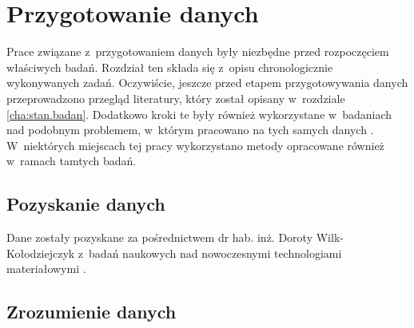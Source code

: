\chapter{Przygotowanie danych}
\label{cha:przyg.danych}

Prace związane z~przygotowaniem danych były niezbędne przed rozpoczęciem właściwych badań. Rozdział ten składa się z~opisu chronologicznie wykonywanych zadań. Oczywiście, jeszcze przed etapem przygotowywania danych przeprowadzono przegląd literatury, który został opisany w~rozdziale \ref{cha:stan.badan}. Dodatkowo kroki te były również wykorzystane w~badaniach nad podobnym problemem, w~którym pracowano na tych samych danych \cite{Reczek21}. W~niektórych miejscach tej pracy wykorzystano metody opracowane również w~ramach tamtych badań.

\section{Pozyskanie danych}
\label{sec:pozyskanie_danych}

Dane zostały pozyskane za pośrednictwem dr hab. inż. Doroty Wilk-Kołodziejczyk z~badań naukowych nad nowoczesnymi technologiami materiałowymi \cite{Pirowski17, specodlew}.

\section{Zrozumienie danych}
\label{sec:zrozumienie_danych}

